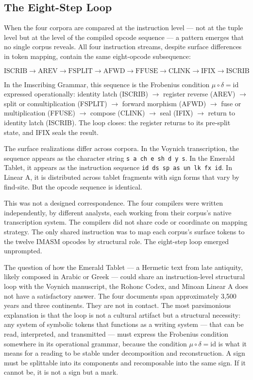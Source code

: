 \documentclass[12pt,a4paper]{article}
\begin{document}
\subsection{The Eight-Step Loop}

When the four corpora are compared at the instruction level --- not at the tuple level but at the level of the compiled opcode sequence --- a pattern emerges that no single corpus reveals. All four instruction streams, despite surface differences in token mapping, contain the same eight-opcode subsequence:

\[\text{ISCRIB} \to \text{AREV} \to \text{FSPLIT} \to \text{AFWD} \to \text{FFUSE} \to \text{CLINK} \to \text{IFIX} \to \text{ISCRIB}\]

In the Imscribing Grammar, this sequence is the Frobenius condition $\mu \circ \delta = \text{id}$ expressed operationally: identity latch (ISCRIB) $\rightarrow$ register reverse (AREV) $\rightarrow$ split or comultiplication (FSPLIT) $\rightarrow$ forward morphism (AFWD) $\rightarrow$ fuse or multiplication (FFUSE) $\rightarrow$ compose (CLINK) $\rightarrow$ seal (IFIX) $\rightarrow$ return to identity latch (ISCRIB). The loop closes: the register returns to its pre-split state, and IFIX seals the result.

The surface realizations differ across corpora. In the Voynich transcription, the sequence appears as the character string \texttt{s a ch e sh d y s}. In the Emerald Tablet, it appears as the instruction sequence \texttt{id ds sp as un lk fx id}. In Linear A, it is distributed across tablet fragments with sign forms that vary by find-site. But the opcode sequence is identical.

This was not a designed correspondence. The four compilers were written independently, by different analysts, each working from their corpus's native transcription system. The compilers did not share code or coordinate on mapping strategy. The only shared instruction was to map each corpus's surface tokens to the twelve IMASM opcodes by structural role. The eight-step loop emerged unprompted.

The question of how the Emerald Tablet --- a Hermetic text from late antiquity, likely composed in Arabic or Greek --- could share an instruction-level structural loop with the Voynich manuscript, the Rohonc Codex, and Minoan Linear A does not have a satisfactory answer. The four documents span approximately 3,500 years and three continents. They are not in contact. The most parsimonious explanation is that the loop is not a cultural artifact but a structural necessity: any system of symbolic tokens that functions as a writing system --- that can be read, interpreted, and transmitted --- must express the Frobenius condition somewhere in its operational grammar, because the condition $\mu \circ \delta = \text{id}$ is what it means for a reading to be stable under decomposition and reconstruction. A sign must be splittable into its components and recomposable into the same sign. If it cannot be, it is not a sign but a mark.
\end{document}
